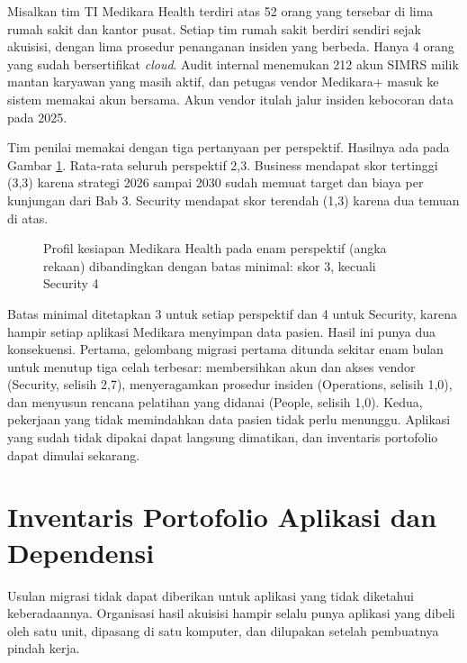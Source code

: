 \begin{kasus}[title={Kasus Medikara Health: Kesiapan Tim TI yang Tersebar}]
  Misalkan tim TI Medikara Health terdiri atas 52 orang yang tersebar di lima rumah sakit
  dan kantor pusat. Setiap tim rumah sakit berdiri sendiri sejak akuisisi, dengan lima
  prosedur penanganan insiden yang berbeda. Hanya 4 orang yang sudah bersertifikat
  \textit{cloud}. Audit internal menemukan 212 akun SIMRS milik mantan karyawan yang masih
  aktif, dan petugas vendor Medikara+ masuk ke sistem memakai akun bersama. Akun vendor
  itulah jalur insiden kebocoran data pada 2025.

  Tim penilai memakai  dengan
  tiga pertanyaan per perspektif. Hasilnya ada pada Gambar \ref{fig:ch04-profil-kesiapan}.
  Rata-rata seluruh perspektif 2,3. Business mendapat skor tertinggi (3,3) karena strategi
  2026 sampai 2030 sudah memuat target dan biaya per kunjungan dari Bab 3. Security
  mendapat skor terendah (1,3) karena dua temuan di atas.

  \begin{figure}[H]
    \centering
    
    \caption{Profil kesiapan Medikara Health pada enam perspektif (angka rekaan)
             dibandingkan dengan batas minimal: skor 3, kecuali Security 4}
    \label{fig:ch04-profil-kesiapan}
  \end{figure}

  Batas minimal ditetapkan 3 untuk setiap perspektif dan 4 untuk Security, karena hampir
  setiap aplikasi Medikara menyimpan data pasien. Hasil ini punya dua konsekuensi.
  Pertama, gelombang migrasi pertama ditunda sekitar enam bulan untuk menutup tiga celah
  terbesar: membersihkan akun dan akses vendor (Security, selisih 2,7), menyeragamkan
  prosedur insiden (Operations, selisih 1,0), dan menyusun rencana pelatihan yang didanai
  (People, selisih 1,0). Kedua, pekerjaan yang tidak memindahkan data pasien tidak perlu
  menunggu. Aplikasi yang sudah tidak dipakai dapat langsung dimatikan, dan inventaris
  portofolio dapat dimulai sekarang.
\end{kasus}

\section{Inventaris Portofolio Aplikasi dan Dependensi}
\label{sec:ch04-inventaris}

Usulan migrasi tidak dapat diberikan untuk aplikasi yang tidak diketahui keberadaannya.
Organisasi hasil akuisisi hampir selalu punya aplikasi yang dibeli oleh satu unit, dipasang
di satu komputer, dan dilupakan setelah pembuatnya pindah kerja.

